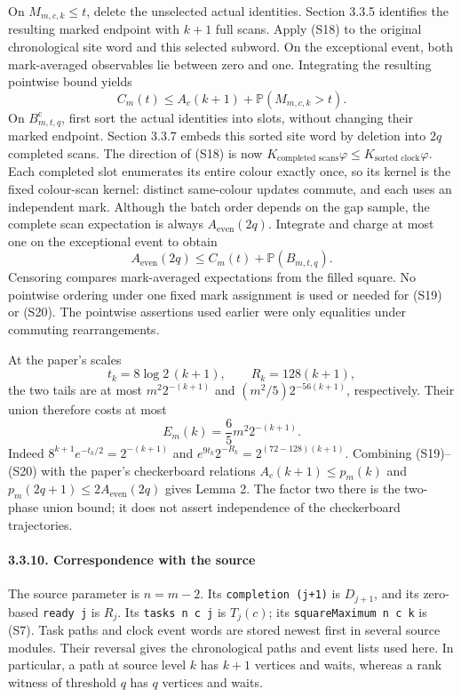 \documentclass[
  11pt,
  a4paper,
]{article}
\begin{document}
On \(M_{m,c,k}\leq t\), delete the unselected actual identities. Section
3.3.5 identifies the resulting marked endpoint with \(k+1\) full scans.
Apply (S18) to the original chronological site word and this selected
subword. On the exceptional event, both mark-averaged observables lie
between zero and one. Integrating the resulting pointwise bound yields
\[
C_m(t)\leq A_c(k+1)+\mathbb P(M_{m,c,k}>t).
\tag{S19}
\] On \(B_{m,t,q}^{\mathrm c}\), first sort the actual identities into
slots, without changing their marked endpoint. Section 3.3.7 embeds this
sorted site word by deletion into \(2q\) completed scans. The direction
of (S18) is now
\(K_{\text{completed scans}}\varphi\leq K_{\text{sorted clock}}\varphi\).
Each completed slot enumerates its entire colour exactly once, so its
kernel is the fixed colour-scan kernel: distinct same-colour updates
commute, and each uses an independent mark. Although the batch order
depends on the gap sample, the complete scan expectation is always
\(A_{\mathrm{even}}(2q)\). Integrate and charge at most one on the
exceptional event to obtain \[
A_{\mathrm{even}}(2q)\leq C_m(t)+\mathbb P(B_{m,t,q}).
\tag{S20}
\] Censoring compares mark-averaged expectations from the filled square.
No pointwise ordering under one fixed mark assignment is used or needed
for (S19) or (S20). The pointwise assertions used earlier were only
equalities under commuting rearrangements.

At the paper's scales \[
t_k=8\log2\,(k+1),\qquad R_k=128(k+1),
\] the two tails are at most \(m^2 2^{-(k+1)}\) and
\((m^2/5)2^{-56(k+1)}\), respectively. Their union therefore costs at
most \[
E_m(k)=\frac65m^2 2^{-(k+1)}.
\] Indeed \(8^{k+1}e^{-t_k/2}=2^{-(k+1)}\) and
\(e^{9t_k}2^{-R_k}=2^{(72-128)(k+1)}\). Combining (S19)--(S20) with the
paper's checkerboard relations \(A_c(k+1)\leq p_m(k)\) and
\(p_m(2q+1)\leq2A_{\mathrm{even}}(2q)\) gives Lemma 2. The factor two
there is the two-phase union bound; it does not assert independence of
the checkerboard trajectories.

\paragraph{3.3.10. Correspondence with the
source}\label{correspondence-with-the-source}

The source parameter is \(n=m-2\). Its \texttt{completion\ (j+1)} is
\(D_{j+1}\), and its zero-based \texttt{ready\ j} is \(R_j\). Its
\texttt{tasks\ n\ c\ j} is \(T_j(c)\); its
\texttt{squareMaximum\ n\ c\ k} is (S7). Task paths and clock event
words are stored newest first in several source modules. Their reversal
gives the chronological paths and event lists used here. In particular,
a path at source level \(k\) has \(k+1\) vertices and waits, whereas a
rank witness of threshold \(q\) has \(q\) vertices and waits.
\end{document}

